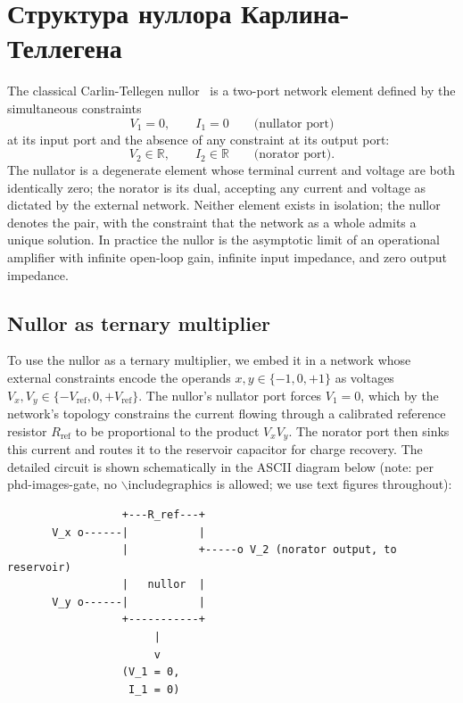 \section{Структура нуллора Карлина-Теллегена}
\label{sec:nullor_structure}

The classical Carlin-Tellegen nullor~\cite{carlin1964singular,tellegen1966nullor} is
a two-port network element defined by the simultaneous constraints
\[
  V_1 = 0, \qquad I_1 = 0 \qquad \text{(nullator port)}
\]
at its input port and the absence of any constraint at its output port:
\[
  V_2 \in \mathbb{R}, \qquad I_2 \in \mathbb{R} \qquad \text{(norator port)}.
\]
The nullator is a degenerate element whose terminal current and voltage are both
identically zero; the norator is its dual, accepting any current and voltage as
dictated by the external network.  Neither element exists in isolation; the nullor
denotes the pair, with the constraint that the network as a whole admits a unique
solution.  In practice the nullor is the asymptotic limit of an operational amplifier
with infinite open-loop gain, infinite input impedance, and zero output impedance.

\subsection{Nullor as ternary multiplier}
\label{subsec:nullor_mult}

To use the nullor as a ternary multiplier, we embed it in a network whose external
constraints encode the operands $x, y \in \{-1, 0, +1\}$ as voltages
$V_x, V_y \in \{-V_{\text{ref}}, 0, +V_{\text{ref}}\}$.  The nullor's nullator port
forces $V_1 = 0$, which by the network's topology constrains the current flowing
through a calibrated reference resistor $R_{\text{ref}}$ to be proportional to the
product $V_x V_y$.  The norator port then sinks this current and routes it to the
reservoir capacitor for charge recovery.  The detailed circuit is shown
schematically in the ASCII diagram below (note: per phd-images-gate, no
$\backslash$includegraphics is allowed; we use text figures throughout):

\begin{verbatim}
                  +---R_ref---+
       V_x o------|           |
                  |           +-----o V_2 (norator output, to reservoir)
                  |   nullor  |
       V_y o------|           |
                  +-----------+
                       |
                       v
                  (V_1 = 0,
                   I_1 = 0)
\end{verbatim}

